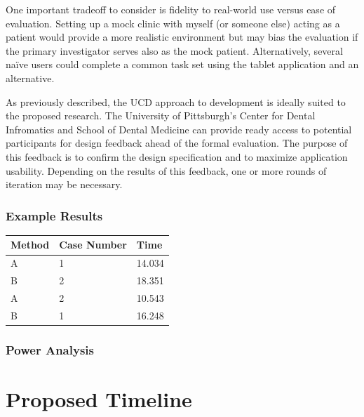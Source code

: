 \documentclass[11pt]{article}
\newcommand{\ra}[1]{\renewcommand{\arraystretch}{#1}}
\begin{document}
One important tradeoff to consider is fidelity to real-world use versus ease of evaluation. Setting up a mock clinic with myself (or someone else) acting as a patient would provide a more realistic environment but may bias the evaluation if the primary investigator serves also as the mock patient. Alternatively, several na\"{i}ve users could complete a common task set using the tablet application and an alternative.

As previously described, the UCD approach to development is ideally suited to the proposed research. The University of Pittsburgh's Center for Dental Infromatics and School of Dental Medicine can provide ready access to potential participants for design feedback ahead of the formal evaluation. The purpose of this feedback is to confirm the design specification and to maximize application usability. Depending on the results of this feedback, one or more rounds of iteration may be necessary.

\subsubsection{Example Results}

\begin{table}[h]
\begin{center}
\ra{1.3}
\begin{tabular}{l l l}
\toprule
\textbf{Method}	&	\textbf{Case Number}	&  \textbf{Time} \\
\midrule
A		&	1				&	14.034  \\
B		&	2				&	18.351  \\
A		&	2				&	10.543  \\
B		&	1				&	16.248  \\
\bottomrule
\end{tabular}\end{center}\end{table}

\subsubsection{Power Analysis}

\newpage

\section{Proposed Timeline}
\end{document}
